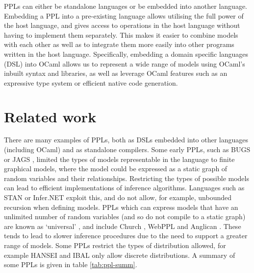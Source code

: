 PPLs can either be standalone languages or be embedded into another language. Embedding a PPL into a pre-existing language allows utilising the full power of the host language, and gives access to operations in the host language without having to implement them separately. This makes it easier to combine models with each other as well as to integrate them more easily into other programs written in the host language. Specifically, embedding a domain specific languages (DSL) into OCaml allows us to represent a wide range of models using OCaml's inbuilt syntax and libraries, as well as leverage OCaml features such as an expressive type system or efficient native code generation.

\section{Related work}
There are many examples of PPLs, both as DSLs embedded into other languages (including OCaml) and as standalone compilers. Some early PPLs, such as BUGS \cite{gilks1994bugs} or JAGS \cite{plummer2004jags}, limited the types of models representable in the language to finite graphical models, where the model could be expressed as a static graph of random variables and their relationships. Restricting the types of possible models can lead to efficient implementations of inference algorithms. Languages such as STAN \cite{carpenter2017stan} or Infer.NET \cite{wang2011using} exploit this, and do not allow, for example, unbounded recursion when defining models. PPLs which can express models that have an unlimited number of random variables (and so do not compile to a static graph) are known as `universal' \cite{borgstrom2016lambda}, and include Church \cite{goodman2012church}, WebPPL \cite{mobus2018structure} and Anglican \cite{anglican-smc}. These tends to lead to slower inference procedures due to the need to support a greater range of models. Some PPLs restrict the types of distribution allowed, for example HANSEI \cite{kiselyov2009embedded} and IBAL \cite{ibal} only allow discrete distributions. A summary of some PPLs is given in table \ref{tab:ppl-summ}.

